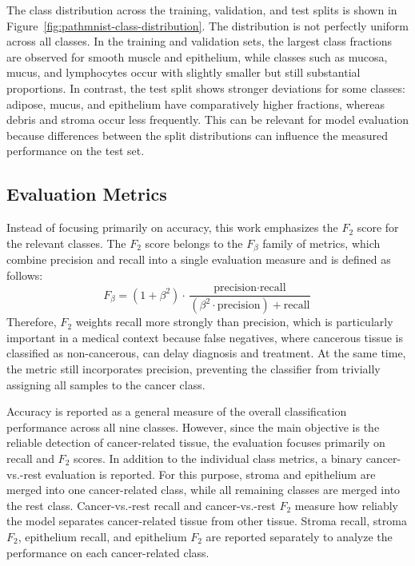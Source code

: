 The class distribution across the training, validation, and test splits is shown
in Figure~\ref{fig:pathmnist-class-distribution}. The distribution is not
perfectly uniform across all classes. In the training and validation sets, the
largest class fractions are observed for smooth muscle and epithelium, while
classes such as mucosa, mucus, and lymphocytes occur with slightly smaller but
still substantial proportions. In contrast, the test split shows stronger
deviations for some classes: adipose, mucus, and epithelium have comparatively
higher fractions, whereas debris and stroma occur less frequently. This can be
relevant for model evaluation because differences between the split
distributions can influence the measured performance on the test set.


\subsection{Evaluation Metrics}
Instead of focusing primarily on accuracy, this work emphasizes the $F_2$ score
for the relevant classes. The $F_2$ score belongs to the $F_\beta$ family of
metrics, which combine precision and recall into a single evaluation measure and
is defined as follows: $$ F_\beta = (1 + \beta^2) \cdot \frac{\text{precision}
\cdot \text{recall}}{(\beta^2 \cdot \text{precision}) + \text{recall}} $$
Therefore, $F_2$ weights recall more strongly than precision, which is
particularly important in a medical context because false negatives, where
cancerous tissue is classified as non-cancerous, can delay diagnosis and
treatment. At the same time, the metric still incorporates precision, preventing
the classifier from trivially assigning all samples to the cancer class.

Accuracy is reported as a general measure of the overall classification
performance across all nine classes. However, since the main objective is the
reliable detection of cancer-related tissue, the evaluation focuses primarily on
recall and $F_2$ scores. In addition to the individual class metrics, a binary
cancer-vs.-rest evaluation is reported. For this purpose, stroma and epithelium
are merged into one cancer-related class, while all remaining classes are merged
into the rest class. Cancer-vs.-rest recall and cancer-vs.-rest $F_2$ measure
how reliably the model separates cancer-related tissue from other tissue. Stroma
recall, stroma $F_2$, epithelium recall, and epithelium $F_2$ are reported
separately to analyze the performance on each cancer-related class.



